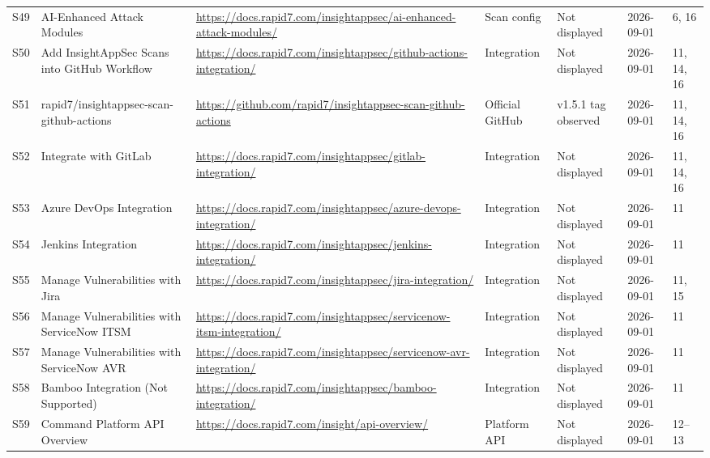 \documentclass[11pt,letterpaper,oneside]{scrreprt}
\begin{document}
\begin{landscape}
\begin{longtable}{@{}P{0.34in}P{1.40in}P{3.00in}P{0.95in}P{0.75in}P{0.72in}P{1.55in}@{}}
\label{src:S49}S49 & AI-Enhanced Attack Modules & \url{https://docs.rapid7.com/insightappsec/ai-enhanced-attack-modules/} & Scan config & Not displayed & 2026-09-01 & 6, 16\\
\label{src:S50}S50 & Add InsightAppSec Scans into GitHub Workflow & \url{https://docs.rapid7.com/insightappsec/github-actions-integration/} & Integration & Not displayed & 2026-09-01 & 11, 14, 16\\
\label{src:S51}S51 & rapid7/insightappsec-scan-github-actions & \url{https://github.com/rapid7/insightappsec-scan-github-actions} & Official GitHub & v1.5.1 tag observed & 2026-09-01 & 11, 14, 16\\
\label{src:S52}S52 & Integrate with GitLab & \url{https://docs.rapid7.com/insightappsec/gitlab-integration/} & Integration & Not displayed & 2026-09-01 & 11, 14, 16\\
\label{src:S53}S53 & Azure DevOps Integration & \url{https://docs.rapid7.com/insightappsec/azure-devops-integration/} & Integration & Not displayed & 2026-09-01 & 11\\
\label{src:S54}S54 & Jenkins Integration & \url{https://docs.rapid7.com/insightappsec/jenkins-integration/} & Integration & Not displayed & 2026-09-01 & 11\\
\label{src:S55}S55 & Manage Vulnerabilities with Jira & \url{https://docs.rapid7.com/insightappsec/jira-integration/} & Integration & Not displayed & 2026-09-01 & 11, 15\\
\label{src:S56}S56 & Manage Vulnerabilities with ServiceNow ITSM & \url{https://docs.rapid7.com/insightappsec/servicenow-itsm-integration/} & Integration & Not displayed & 2026-09-01 & 11\\
\label{src:S57}S57 & Manage Vulnerabilities with ServiceNow AVR & \url{https://docs.rapid7.com/insightappsec/servicenow-avr-integration/} & Integration & Not displayed & 2026-09-01 & 11\\
\label{src:S58}S58 & Bamboo Integration (Not Supported) & \url{https://docs.rapid7.com/insightappsec/bamboo-integration/} & Integration & Not displayed & 2026-09-01 & 11\\
\label{src:S59}S59 & Command Platform API Overview & \url{https://docs.rapid7.com/insight/api-overview/} & Platform API & Not displayed & 2026-09-01 & 12--13\\
\end{longtable}
\normalsize
\end{landscape}
\end{document}
